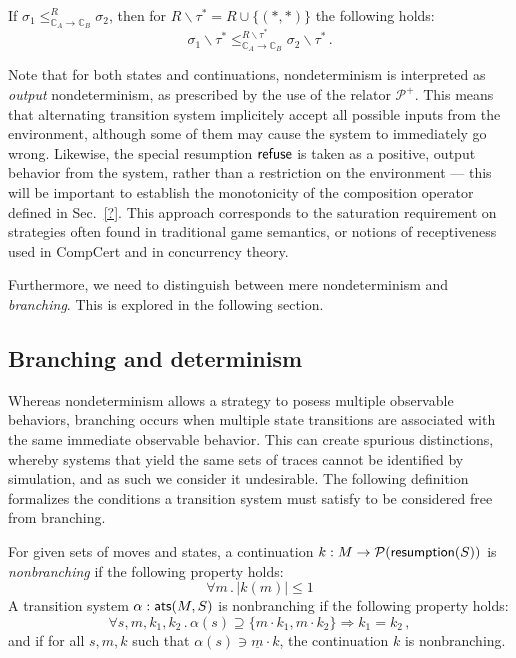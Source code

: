 \begin{lemma}
If $\sigma_1 \le_{\mathbb{C}_A \rightarrow \mathbb{C}_B}^R \sigma_2$,
then for $R \backslash \tau^* = R \cup \{(\ast, \ast)\}$
the following holds:
\[
  \sigma_1 \backslash \tau^*
  \le_{\mathbb{C}_A \rightarrow \mathbb{C}_B}^{R \backslash \tau^*}
  \sigma_2 \backslash \tau^* \,.
\]
\end{lemma}



{ \color{gray}
Note that for both states and continuations,
nondeterminism is interpreted as \emph{output} nondeterminism,
as prescribed by the use of the relator $\mathcal{P}^+$.
This means that alternating transition system
implicitely accept all possible inputs from the environment,
although some of them may cause the system to immediately go wrong.
Likewise,
the special resumption $ \mathsf{refuse} $
is taken as a positive, output behavior from the system,
rather than a restriction on the environment ---
this will be important to establish the monotonicity
of the composition operator defined in Sec.~\ref{?}.
This approach corresponds to the saturation requirement on strategies
often found in traditional game semantics,
or notions of receptiveness used in CompCert
and in concurrency theory.

Furthermore, we need to distinguish between mere nondeterminism
and \emph{branching}.
This is explored in the following section.

\subsection{Branching and determinism}

Whereas nondeterminism allows a strategy to posess
multiple observable behaviors,
branching occurs when multiple state transitions
are associated with the same immediate observable behavior.
This can create spurious distinctions,
whereby systems that yield the same sets of traces
cannot be identified by simulation,
and as such we consider it undesirable.
The following definition
formalizes the conditions a transition system must satisfy
to be considered free from branching.

\begin{definition}
For given sets of moves and states,
a continuation $k : M \rightarrow \mathcal{P}( \mathsf{resumption} (S))$
is \emph{nonbranching} if the following property holds:
\[ \forall m \,.\, | k(m) | \le 1 \]
A transition system $\alpha :  \mathsf{ats} (M, S)$ is nonbranching
if the following property holds:
\[ \forall s, m, k_1, k_2 \,.\,
     \alpha(s) \supseteq \{ m \cdot k_1, m \cdot k_2 \} \Rightarrow
     k_1 = k_2 \,, \]
and if for all $s, m, k$ such that $\alpha(s) \ni \underline{m} \cdot k$,
the continuation $k$ is nonbranching.
\end{definition}

}
